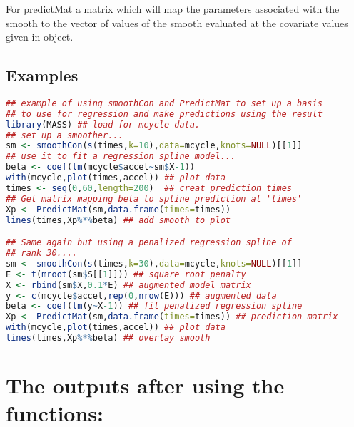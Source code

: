 \documentclass{article}
\begin{document}
For predictMat a matrix which will map the parameters associated with the smooth to the vector of values of the smooth evaluated at the covariate values given in object.


\subsection{Examples}

\begin{lstlisting}[language=R]
## example of using smoothCon and PredictMat to set up a basis
## to use for regression and make predictions using the result
library(MASS) ## load for mcycle data.
## set up a smoother...
sm <- smoothCon(s(times,k=10),data=mcycle,knots=NULL)[[1]]
## use it to fit a regression spline model...
beta <- coef(lm(mcycle$accel~sm$X-1))
with(mcycle,plot(times,accel)) ## plot data
times <- seq(0,60,length=200)  ## creat prediction times
## Get matrix mapping beta to spline prediction at 'times'
Xp <- PredictMat(sm,data.frame(times=times))
lines(times,Xp%*%beta) ## add smooth to plot

## Same again but using a penalized regression spline of
## rank 30....
sm <- smoothCon(s(times,k=30),data=mcycle,knots=NULL)[[1]]
E <- t(mroot(sm$S[[1]])) ## square root penalty
X <- rbind(sm$X,0.1*E) ## augmented model matrix
y <- c(mcycle$accel,rep(0,nrow(E))) ## augmented data
beta <- coef(lm(y~X-1)) ## fit penalized regression spline
Xp <- PredictMat(sm,data.frame(times=times)) ## prediction matrix
with(mcycle,plot(times,accel)) ## plot data
lines(times,Xp%*%beta) ## overlay smooth
\end{lstlisting}



\section{The outputs after using the functions:}
\end{document}
